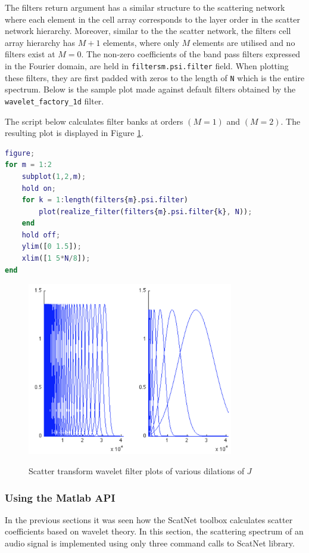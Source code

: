The filters return argument has a similar structure to the scattering network where each element in the cell array corresponds to the layer order in the scatter network hierarchy. Moreover, similar to the the scatter network, the filters cell array hierarchy has $M+1$ elements, where only $M$ elements are utilised and no filters exist at $M=0$. The non-zero coefficients of the band pass filters expressed in the Fourier domain, are held in \texttt{filters{m}.psi.filter} field. When plotting these filters, they are first padded with zeros to the length of \texttt{N} which is the entire spectrum.  Below is the sample plot made against default filters obtained by the \texttt{wavelet\_factory\_1d} filter.

The script below calculates filter banks at orders $(M = 1)$ and $(M = 2)$.  The resulting plot is displayed in Figure \ref{fig_c3_wplot}.

\begin{lstlisting}[language=Matlab]
figure;
for m = 1:2
    subplot(1,2,m);
    hold on;
    for k = 1:length(filters{m}.psi.filter)
        plot(realize_filter(filters{m}.psi.filter{k}, N));
    end
    hold off;
    ylim([0 1.5]);
    xlim([1 5*N/8]);
end
\end{lstlisting}

\begin{figure}
\centering
  \includegraphics[width=9cm]{thesis/images/wfplot}\\
  \caption{Scatter transform wavelet filter plots of various dilations of $J$}\label{fig_c3_wplot}
\end{figure}

\subsubsection{Using the Matlab API}\label{sec_c3_scat02}
In the previous sections it was seen how the ScatNet toolbox calculates scatter coefficients based on wavelet theory.  In this section, the scattering spectrum of an audio signal is implemented using only three command calls to ScatNet library.

